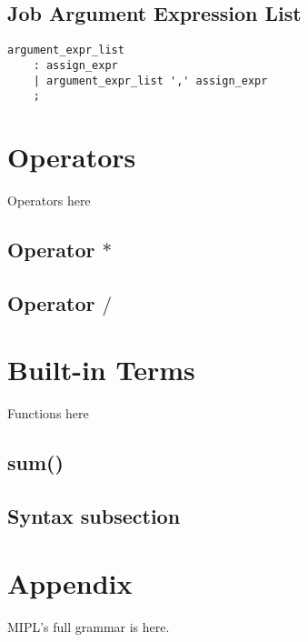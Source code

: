 \documentclass[prodmode,acmtecs]{acmsmall}
\begin{document}
\subsection{Job Argument Expression List}

\begin{lstlisting}
argument_expr_list
	: assign_expr
	| argument_expr_list ',' assign_expr
	;
\end{lstlisting}

\section{Operators}
Operators here

\subsection{Operator $*$}

\subsection{Operator $/$}

\section{Built-in Terms}
Functions here

\subsection{sum()}

\subsection{Syntax subsection}

\section*{Appendix}

MIPL's full grammar is here.

%


\end{document}
